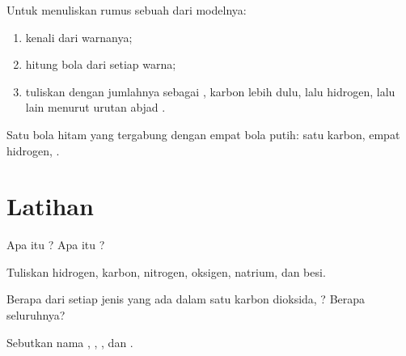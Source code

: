 \begin{method}\label{met:g7:atoms-and-molecules:model}
Untuk menuliskan rumus sebuah  dari modelnya:
\begin{enumerate}
  \item kenali  dari warnanya;
  \item hitung bola dari setiap warna;
  \item tuliskan  dengan jumlahnya sebagai , karbon lebih dulu, lalu hidrogen, lalu  lain
        menurut urutan abjad .
\end{enumerate}
Satu bola hitam yang tergabung dengan empat bola putih: satu karbon,
empat hidrogen, .
\end{method}

\section{Latihan}

\begin{exercise}[$\star$]\label{exo:g7:atoms-and-molecules:1}
Apa itu ? Apa itu ?
\end{exercise}

\begin{exercise}[$\star$]\label{exo:g7:atoms-and-molecules:2}
Tuliskan  hidrogen, karbon, nitrogen, oksigen, natrium, dan
besi.
\end{exercise}

\begin{exercise}[$\star$]\label{exo:g7:atoms-and-molecules:3}
Berapa  dari setiap jenis yang ada dalam satu  karbon
dioksida, ? Berapa  seluruhnya?
\end{exercise}

\begin{exercise}[$\star$]\label{exo:g7:atoms-and-molecules:4}
Sebutkan nama  , , , dan .
\end{exercise}

